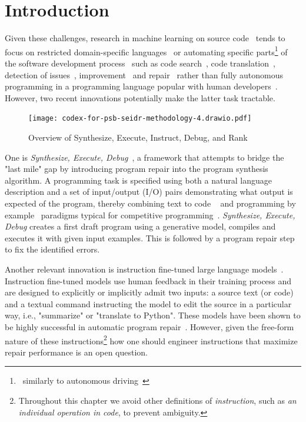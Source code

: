 \section{Introduction}
\label{sec:seidr-intro}



Given these challenges, research in machine learning on source code~\cite{allamanis2018:survey} tends to focus on restricted domain-specific languages~\cite{chen2021:latent,flashmeta,liventsev2021:bf} or automating specific parts\footnote{~similarly to autonomous driving~\cite{grigorescu2020:survey,marcano2020:review}} of the software development process~\cite{lu2021:codexglue,niu2023:crosscodebench} such as code search~\cite{husain2020:codesearchnet}, code translation~\cite{roziere2020:unsupervised}, detection of issues~\cite{fernandes2016:reviewbased,chakraborty2021:deep}, improvement~\cite{petke2018:genetic} and repair~\cite{gouesAutomatedProgramRepair2019} rather than fully autonomous programming in a programming language popular with human developers~\cite{:tiobe}.
However, two recent innovations potentially make the latter task tractable.

\begin{figure}
    \centering
    \texttt{[image: codex-for-psb-seidr-methodology-4.drawio.pdf]}
    \caption{Overview of Synthesize, Execute, Instruct, Debug, and Rank}
    \label{fig:method}
\end{figure}

One is \emph{Synthesize, Execute, Debug}~\cite{guptaSynthesizeExecuteDebug2020}, a framework that attempts to bridge the "last mile" gap by introducing program repair into the program synthesis algorithm. 
A programming task is specified using both a natural language description and a set of input/output (I/O) pairs demonstrating what output is expected of the program, thereby combining text to code ~\cite{iyer2018:mapping} and programming by example~\cite{halbertProgrammingExample1984,gulwani2016:programming} paradigms typical for competitive programming~\cite{zavershynskyi2018:naps}.
\emph{Synthesize, Execute, Debug} creates a first draft program using a generative model, compiles and executes it with given input examples.
This is followed by a program repair step to fix the identified errors.

Another relevant innovation is instruction fine-tuned large language models~\cite{ouyang2022:training}. Instruction fine-tuned models use human feedback in their training process and are designed to explicitly or implicitly admit two inputs: a source text (or code) and a textual command instructing the model to edit the source in a particular way, i.e., "summarize" or "translate to Python".
These models have been shown to be highly successful in automatic program repair~\cite{fanAutomatedRepairPrograms2023}. 
However, given the free-form nature of these instructions\footnote{Throughout this chapter we avoid other definitions of \emph{instruction}, such as \emph{an individual operation in code}, to prevent ambiguity.} how one should engineer instructions that maximize repair performance is an open question. 

